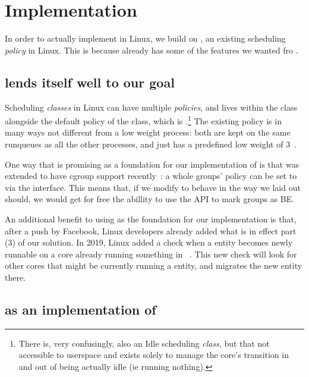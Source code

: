 \section{Implementation}\label{s:implementation}


In order to actually implement \beclass{} in Linux, we build on \schedidle{}, an
existing scheduling \textit{policy} in Linux. This is because \schedidle{}
already has some of the features we wanted fro \beclass{}.

\subsection{\schedidle{} lends itself well to our goal}

Scheduling \textit{classes} in Linux can have multiple \textit{policies}, and
\schedidle{} lives within the \normalclass{} class alongside the default policy
of the \normalclass{} class, which is \schednormal{}.\footnote{There is, very
confusingly, also an Idle scheduling \textit{class}, but that not accessible to
userspace and exists solely to manage the core's transition in and out of being
actually idle (ie running nothing).} The existing \schedidle{} policy is in many
ways not different from a low weight \schednormal{} process: both are kept on
the same runqueues as all the other \schednormal{} processes, and \schedidle{}
just has a predefined low weight of 3~\cite{weight-idleprio}.

One way that \schedidle{} is promising as a foundation for our implementation of
\beclass{} is that \schedidle{} was extended to have cgroup support
recently~\cite{lkml-idle-cgroup}: a whole groups' policy can be set to
\schedidle{} via the \cgroups{} interface. This means that, if we modify
\schedidle{} to behave in the way we laid out \beclass{} should, we would get
for free the abillity to use the \cgroups{} API to mark groups as BE.

An additional benefit to using \schedidle{} as the foundation for our
implementation is that, after a push by Facebook, Linux developers already added
what is in effect part (3) of our solution. In 2019, Linux added a check when a
\schednormal{} entity becomes newly runnable on a core already running something
in \schednormal{}~\cite{fixing-idle-article}. This new check will look for other
cores that might be currently running a \schedidle{} entity, and migrates the
new entity there.

\subsection{\schedbe{} as an implementation of \beclass{}}

